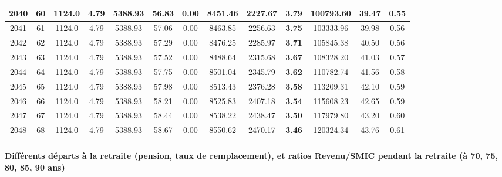 {\begin{center}
\begin{tabular}[htb]{|c|c||c|c|c|c|c|c||c|c||c|c|c||}
\hline 
 2040 &  60 &  1124.0 &  4.79 &  5388.93 &  56.83 &  0.00 &  8451.46 &  2227.67 &  {\bf 3.79} &  100793.60 &  39.47 &  0.55 \\ 
\hline 
 2041 &  61 &  1124.0 &  4.79 &  5388.93 &  57.06 &  0.00 &  8463.85 &  2256.63 &  {\bf 3.75} &  103333.96 &  39.98 &  0.56 \\ 
\hline 
 2042 &  62 &  1124.0 &  4.79 &  5388.93 &  57.29 &  0.00 &  8476.25 &  2285.97 &  {\bf 3.71} &  105845.38 &  40.50 &  0.56 \\ 
\hline 
 2043 &  63 &  1124.0 &  4.79 &  5388.93 &  57.52 &  0.00 &  8488.64 &  2315.68 &  {\bf 3.67} &  108328.20 &  41.03 &  0.57 \\ 
\hline 
 2044 &  64 &  1124.0 &  4.79 &  5388.93 &  57.75 &  0.00 &  8501.04 &  2345.79 &  {\bf 3.62} &  110782.74 &  41.56 &  0.58 \\ 
\hline 
 2045 &  65 &  1124.0 &  4.79 &  5388.93 &  57.98 &  0.00 &  8513.43 &  2376.28 &  {\bf 3.58} &  113209.31 &  42.10 &  0.59 \\ 
\hline 
 2046 &  66 &  1124.0 &  4.79 &  5388.93 &  58.21 &  0.00 &  8525.83 &  2407.18 &  {\bf 3.54} &  115608.23 &  42.65 &  0.59 \\ 
\hline 
 2047 &  67 &  1124.0 &  4.79 &  5388.93 &  58.44 &  0.00 &  8538.22 &  2438.47 &  {\bf 3.50} &  117979.80 &  43.20 &  0.60 \\ 
\hline 
 2048 &  68 &  1124.0 &  4.79 &  5388.93 &  58.67 &  0.00 &  8550.62 &  2470.17 &  {\bf 3.46} &  120324.34 &  43.76 &  0.61 \\ 
\hline 
\hline 
\end{tabular} 
\end{center} } 
\newpage 
 
\paragraph{Différents départs à la retraite (pension, taux de remplacement), et ratios Revenu/SMIC pendant la retraite (à 70, 75, 80, 85, 90 ans)} 

